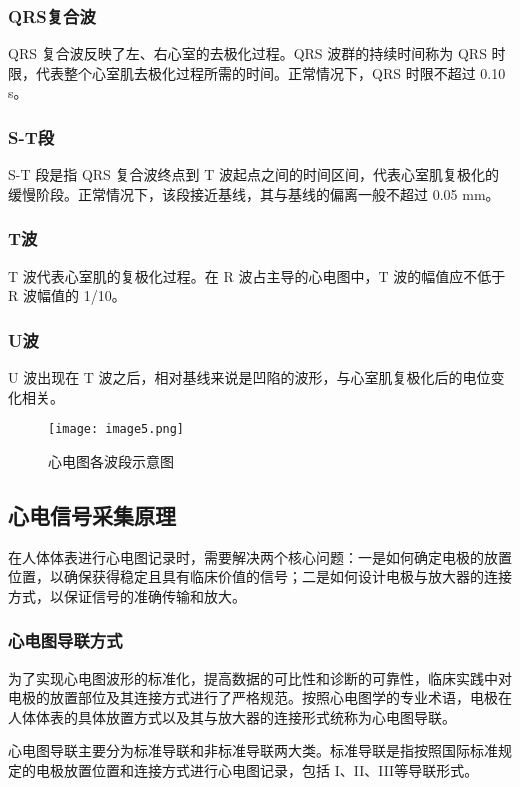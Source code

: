 \subsubsection{QRS复合波}QRS 复合波反映了左、右心室的去极化过程。QRS 波群的持续时间称为 QRS 时限，代表整个心室肌去极化过程所需的时间。正常情况下，QRS 时限不超过 0.10 s。

\subsubsection{S-T段}S-T 段是指 QRS 复合波终点到 T 波起点之间的时间区间，代表心室肌复极化的缓慢阶段。正常情况下，该段接近基线，其与基线的偏离一般不超过 0.05 mm。

\subsubsection{T波}T 波代表心室肌的复极化过程。在 R 波占主导的心电图中，T 波的幅值应不低于 R 波幅值的 1/10。

\subsubsection{U波}U 波出现在 T 波之后，相对基线来说是凹陷的波形，与心室肌复极化后的电位变化相关。

\begin{figure}[hbt]
    \centering
    \texttt{[image: image5.png]}
    \caption{心电图各波段示意图\cite{现代医学电子仪器原理与设计}}
    \label{F.ECG_image5}
\end{figure}

\subsection{心电信号采集原理}
在人体体表进行心电图记录时，需要解决两个核心问题：一是如何确定电极的放置位置，以确保获得稳定且具有临床价值的信号；二是如何设计电极与放大器的连接方式，以保证信号的准确传输和放大。

\subsubsection{心电图导联方式}

为了实现心电图波形的标准化，提高数据的可比性和诊断的可靠性，临床实践中对电极的放置部位及其连接方式进行了严格规范。按照心电图学的专业术语，电极在人体体表的具体放置方式以及其与放大器的连接形式统称为心电图导联。

心电图导联主要分为标准导联和非标准导联两大类。标准导联是指按照国际标准规定的电极放置位置和连接方式进行心电图记录，包括 I、II、III等导联形式。

